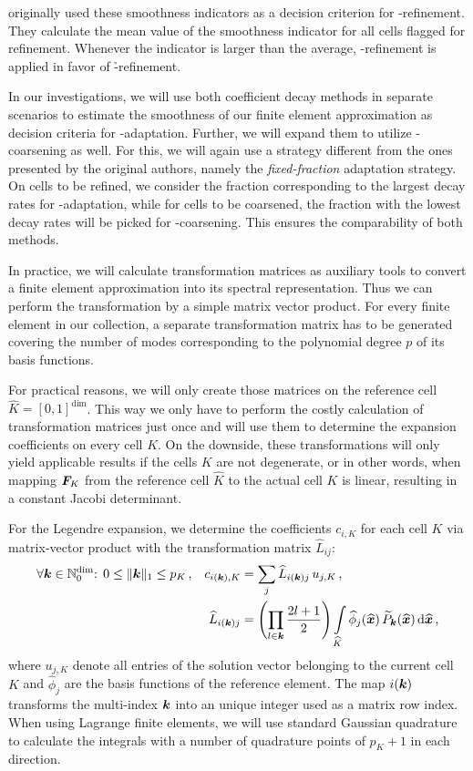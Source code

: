 \textcite{bangerth2009} originally used these smoothness indicators as a decision criterion for \hp-refinement. They calculate the mean value of the smoothness indicator for all cells flagged for refinement. Whenever the indicator is larger than the average, \p-refinement is applied in favor of \h-refinement.

In our investigations, we will use both coefficient decay methods in separate scenarios to estimate the smoothness of our finite element approximation as decision criteria for \hp-adaptation. Further, we will expand them to utilize \hp-coarsening as well. For this, we will again use a strategy different from the ones presented by the original authors, namely the \textit{fixed-fraction} adaptation strategy. On cells to be refined, we consider the fraction corresponding to the largest decay rates for \p-adaptation, while for cells to be coarsened, the fraction with the lowest decay rates will be picked for \p-coarsening. This ensures the comparability of both methods.

In practice, we will calculate transformation matrices as auxiliary tools to convert a finite element approximation into its spectral representation. Thus we can perform the transformation by a simple matrix vector product. For every finite element in our collection, a separate transformation matrix has to be generated covering the number of modes corresponding to the polynomial degree $p$ of its basis functions.

For practical reasons, we will only create those matrices on the reference cell $\widehat{K} = [0,1]^\text{dim}$. This way we only have to perform the costly calculation of transformation matrices just once and will use them to determine the expansion coefficients on every cell $K$. On the downside, these transformations will only yield applicable results if the cells $K$ are not degenerate, or in other words, when mapping $\mat{F}_K$ from the reference cell $\widehat{K}$ to the actual cell $K$ is linear, resulting in a constant Jacobi determinant.

For the Legendre expansion, we determine the coefficients $c_{i,K}$ for each cell $K$ via matrix-vector product with the transformation matrix $\widehat{L}_{ij}$:
\begin{align}
&\forall \tuple{k} \in \mathbb{N}_0^\text{dim} \text{: } 0 \leq \|\tuple{k}\|_1 \leq p_K \,\text{,} &
c_{i(\tuple{k}),K} &= \sum\limits_j \widehat{L}_{i(\tuple{k})j} \, u_{j,K} \,\text{,} \\
&& \widehat{L}_{i(\tuple{k})j} &= \left(\prod\limits_{l \in \tuple{k}} \frac{2l+1}{2}\right) \int\limits_{\widehat{K}} \widehat{\phi}_j(\vec{\widehat{x}}) \, \widetilde{P}_\tuple{k}(\vec{\widehat{x}}) \differential{\vec{\widehat{x}}} \,\text{,}
\end{align}
where $u_{j,K}$ denote all entries of the solution vector belonging to the current cell $K$ and $\widehat{\phi}_j$ are the basis functions of the reference element. The map $i(\tuple{k})$ transforms the multi-index $\tuple{k}$ into an unique integer used as a matrix row index. When using Lagrange finite elements, we will use standard Gaussian quadrature to calculate the integrals with a number of quadrature points of $p_K + 1$ in each direction.

